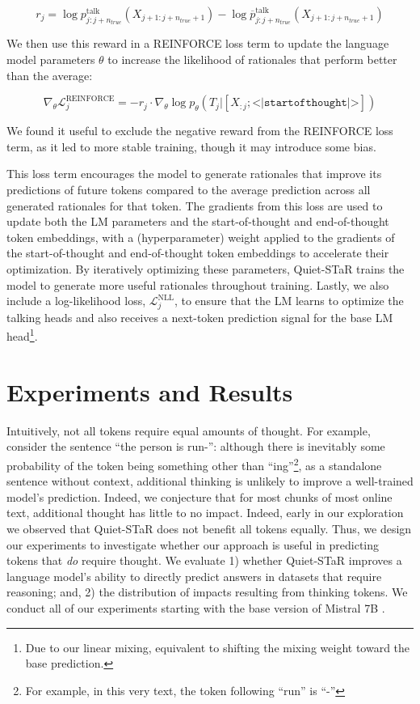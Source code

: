 \documentclass{article} %
\begin{document}
$$r_j = \log p_{j:j+n_{true}}^{\mathrm{talk}}(X_{j+1:j+n_{true} +1}) - \log \overline{p}_{j:j+n_{true}}^{\mathrm{talk}}(X_{j + 1:j+n_{true} + 1})$$\vspace{-12px}

We then use this reward in a REINFORCE loss term to update the language model parameters $\theta$ to increase the likelihood of rationales that perform better than the average:\vspace{-10px}

$$\nabla_\theta \mathcal{L}_j^{\mathrm{REINFORCE}} = -r_j \cdot \nabla_\theta \log p_{\theta}(T_j | [X_{:j}; \texttt{<|startofthought|>}])$$\vspace{-15px}

We found it useful to exclude the negative reward from the REINFORCE loss term, as it led to more stable training, though it may introduce some bias.

This loss term encourages the model to generate rationales that improve its predictions of future tokens compared to the average prediction across all generated rationales for that token. The gradients from this loss are used to update both the LM parameters and the start-of-thought and end-of-thought token embeddings, with a (hyperparameter) weight applied to the gradients of the start-of-thought and end-of-thought token embeddings to accelerate their optimization. By iteratively optimizing these parameters, Quiet-STaR trains the model to generate more useful rationales throughout training. Lastly, we also include a log-likelihood loss, $\mathcal{L}_j^{\mathrm{NLL}}$, to ensure that the LM learns to optimize the talking heads and also receives a next-token prediction signal for the base LM head\footnote{Due to our linear mixing, equivalent to shifting the mixing weight toward the base prediction.}.

\vspace{-5px}
\section{Experiments and Results}\vspace{-3px}

 Intuitively, not all tokens require equal amounts of thought. For example, consider the sentence ``the person is run-'': although there is inevitably some probability of the token being something other than ``ing''\footnote{For example, in this very text, the token following ``run'' is ``-''}, as a standalone sentence without context, additional thinking is unlikely to improve a well-trained model's prediction. Indeed, we conjecture that for most chunks of most online text, additional thought has little to no impact. 
 Indeed, early in our exploration we observed that Quiet-STaR does not benefit all tokens equally.
 Thus, we design our experiments to investigate whether our approach is useful in predicting tokens that \textit{do} require thought. We evaluate 1) whether Quiet-STaR improves a language model's ability to directly predict answers in datasets that require reasoning; and, 2) the distribution of impacts resulting from thinking tokens. We conduct all of our experiments starting with the base version of Mistral 7B \citep{jiang2023mistral}. 
 
\end{document}
